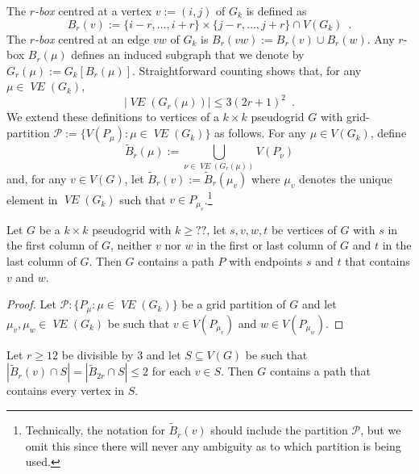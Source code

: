 \documentclass{patmorin}
\newcommand{\defin}[1]{\emph{\color{brown}#1}}
\DeclareMathOperator{\VE}{\mathit{VE}}
\begin{document}
The \defin{$r$-box} centred at a vertex $v:=(i,j)$ of $G_{k}$ is defined as
\[
  B_r(v) := \{i-r,\ldots,i+r\}\times\{j-r,\ldots,j+r\} \cap V(G_{k}) \enspace .
\]
The \defin{$r$-box} centred at an edge $vw$ of $G_{k}$ is $B_r(vw):=B_r(v)\cup B_r(w)$.  
Any $r$-box $B_r(\mu)$ defines an induced subgraph that we denote by $G_r(\mu):=G_{k}[B_r(\mu)]$.  Straightforward counting shows that, for any $\mu\in\VE(G_k)$,
\begin{equation}
   |\VE(G_r(\mu))| \le 3(2r+1)^2 \enspace . \label{rbox_size} %
\end{equation}
We extend these definitions to vertices of a $k\times k$ pseudogrid $G$ with grid-partition $\mathcal{P}:=\{V(P_\mu):\mu\in\VE(G_k)\}$ as follows. For any $\mu\in V(G_k)$, define
\[
   \tilde{B}_r(\mu) := \bigcup_{\nu\in \VE(G_r(\mu))} V(P_\nu)
\]
and, for any $v\in V(G)$, let $\tilde{B}_r(v):=\tilde{B}_r(\mu_v)$
where $\mu_v$ denotes the unique element in $\VE(G_k)$ such that $v\in P_{\mu_v}$.\footnote{Technically, the notation for $\tilde{B}_r(v)$ should include the partition $\mathcal{P}$, but we omit this since there will never any ambiguity as to which partition is being used.}

\begin{lem}\label{pick_up_two}
  Let $G$ be a $k\times k$ pseudogrid with $k\ge??$,  let $s,v,w,t$ be vertices of $G$ with $s$ in the first column of $G$, neither $v$ nor $w$ in the first or last column of $G$ and $t$ in the last column of $G$.  Then $G$ contains a path $P$ with endpoints $s$ and $t$ that contains $v$ and $w$.
\end{lem}

\begin{proof}
  Let $\mathcal{P}:\{P_\mu:\mu\in \VE(G_k)\}$ be a grid partition of $G$ and let $\mu_v,\mu_w\in \VE(G_k)$ be such that $v\in V(P_{\mu_v})$ and $w\in V(P_{\mu_w})$.  
\end{proof}

\begin{lem}\label{pick_up_everything}
  Let $r\ge 12$ be divisible by $3$ and let $S\subseteq V(G)$ be such that $|\tilde{B}_{r}(v)\cap S|=|\tilde{B}_{2r}\cap S|\le 2$ for each $v\in S$.  Then $G$ contains a path that contains every vertex in $S$. 
\end{lem}
\end{document}
